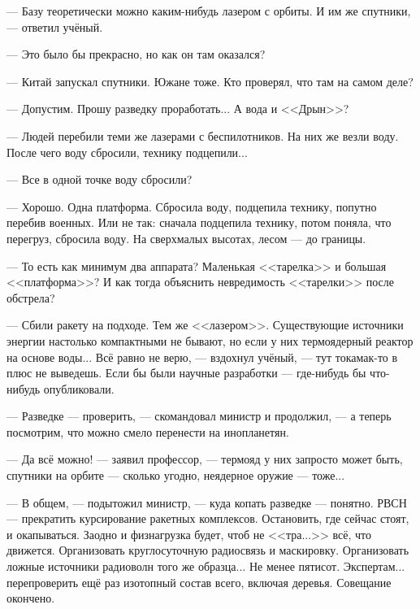 --- Базу теоретически можно каким-нибудь лазером с орбиты. И им же спутники, --- ответил учёный.

--- Это было бы прекрасно, но как он там оказался?

--- Китай запускал спутники. Южане тоже. Кто проверял, что там на самом деле?

--- Допустим. Прошу разведку проработать... А вода и <<Дрын>>?

--- Людей перебили теми же лазерами с беспилотников. На них же везли воду. После чего воду сбросили, технику подцепили...

--- Все в одной точке воду сбросили?

--- Хорошо. Одна платформа. Сбросила воду, подцепила технику, попутно перебив военных.
Или не так: сначала подцепила технику, потом поняла, что перегруз, сбросила воду. На сверхмалых высотах, лесом --- до границы.

--- То есть как минимум два аппарата? Маленькая <<тарелка>> и большая <<платформа>>?
И как тогда объяснить невредимость <<тарелки>> после обстрела?

--- Сбили ракету на подходе. Тем же <<лазером>>. Существующие источники энергии настолько компактными не бывают,
но если у них термоядерный реактор на основе воды... Всё равно не верю, --- вздохнул учёный,
--- тут токамак-то в плюс не выведешь. Если бы были научные разработки --- где-нибудь бы что-нибудь опубликовали.

--- Разведке --- проверить, --- скомандовал министр и продолжил,
--- а теперь посмотрим, что можно смело перенести на инопланетян.

--- Да всё можно! --- заявил профессор, --- термояд у них запросто может быть,
спутники на орбите --- сколько угодно, неядерное оружие --- тоже...

--- В общем, --- подытожил министр, --- куда копать разведке --- понятно.
РВСН --- прекратить курсирование ракетных комплексов. Остановить, где сейчас стоят, и окапываться.
Заодно и физнагрузка будет, чтоб не <<тра...>> всё, что движется.
Организовать круглосуточную радиосвязь и маскировку.
Организовать ложные источники радиоволн того же образца... Не менее пятисот.
Экспертам... перепроверить ещё раз изотопный состав всего, включая деревья. Совещание окончено.

\emptypar

\emptypar

